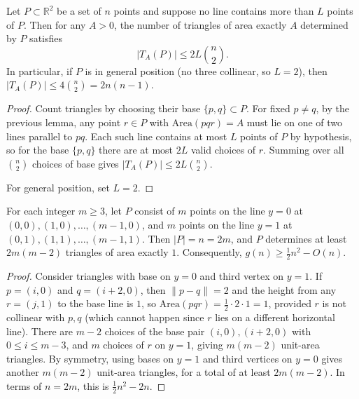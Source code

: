 \begin{lemma}
Let \(P\subset\mathbb{R}^2\) be a set of \(n\) points and suppose no line contains more than \(L\) points of \(P\).
Then for any \(A>0\), the number of triangles of area exactly \(A\) determined by \(P\) satisfies
\[
|T_A(P)|\le 2L\binom{n}{2}.
\]
In particular, if \(P\) is in general position (no three collinear, so \(L=2\)), then \(|T_A(P)|\le 4\binom{n}{2}=2n(n-1)\).
\end{lemma}

\begin{proof}
Count triangles by choosing their base \(\{p,q\}\subset P\).
For fixed \(p\ne q\), by the previous lemma, any point \(r\in P\) with \(\mathrm{Area}(pqr)=A\) must lie on one of two lines parallel to \(pq\). Each such line contains at most \(L\) points of \(P\) by hypothesis, so for the base \(\{p,q\}\) there are at most \(2L\) valid choices of \(r\).
Summing over all \(\binom{n}{2}\) choices of base gives \(|T_A(P)|\le 2L\binom{n}{2}\).

For general position, set \(L=2\).
\end{proof}

\begin{lemma}
For each integer \(m\ge 3\), let
\(P\) consist of \(m\) points on the line \(y=0\) at \((0,0),(1,0),\dots,(m-1,0)\), and \(m\) points on the line \(y=1\) at \((0,1),(1,1),\dots,(m-1,1)\).
Then \(|P|=n=2m\), and \(P\) determines at least \(2m(m-2)\) triangles of area exactly \(1\).
Consequently, \(g(n)\ge \frac12 n^2 - O(n)\).
\end{lemma}

\begin{proof}
Consider triangles with base on \(y=0\) and third vertex on \(y=1\).
If \(p=(i,0)\) and \(q=(i+2,0)\), then \(\|p-q\|=2\) and the height from any \(r=(j,1)\) to the base line is \(1\), so
\(\mathrm{Area}(pqr)=\frac12\cdot 2\cdot 1=1\), provided \(r\) is not collinear with \(p,q\) (which cannot happen since \(r\) lies on a different horizontal line).
There are \(m-2\) choices of the base pair \((i,0),(i+2,0)\) with \(0\le i\le m-3\), and \(m\) choices of \(r\) on \(y=1\), giving \(m(m-2)\) unit-area triangles.
By symmetry, using bases on \(y=1\) and third vertices on \(y=0\) gives another \(m(m-2)\) unit-area triangles, for a total of at least \(2m(m-2)\).
In terms of \(n=2m\), this is \(\frac12 n^2-2n\).
\end{proof}

